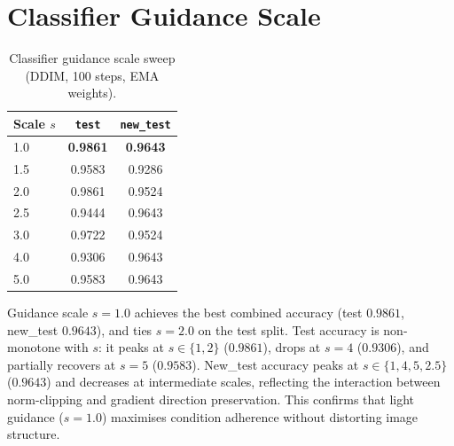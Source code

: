 \documentclass[12pt, a4paper]{report}
\begin{document}
\clearpage
\section{Classifier Guidance Scale}

\begin{table}[H]
\centering
\caption{Classifier guidance scale sweep (DDIM, 100 steps, EMA weights).}
\begin{tabular}{lcc}
\toprule
Scale $s$ & \texttt{test} & \texttt{new\_test} \\
\midrule
1.0 & \textbf{0.9861} & \textbf{0.9643} \\
1.5 & 0.9583 & 0.9286 \\
2.0 & 0.9861 & 0.9524 \\
2.5 & 0.9444 & 0.9643 \\
3.0 & 0.9722 & 0.9524 \\
4.0 & 0.9306 & 0.9643 \\
5.0 & 0.9583 & 0.9643 \\
\bottomrule
\end{tabular}
\end{table}

Guidance scale $s=1.0$ achieves the best combined accuracy (test $0.9861$,
new\_test $0.9643$), and ties $s=2.0$ on the test split.
Test accuracy is non-monotone with $s$: it peaks at $s\in\{1,2\}$ ($0.9861$),
drops at $s=4$ ($0.9306$), and partially recovers at $s=5$ ($0.9583$).
New\_test accuracy peaks at $s\in\{1,4,5,2.5\}$ ($0.9643$) and decreases at
intermediate scales, reflecting the interaction between norm-clipping and gradient
direction preservation.
This confirms that light guidance ($s=1.0$) maximises condition adherence without
distorting image structure.
\end{document}
